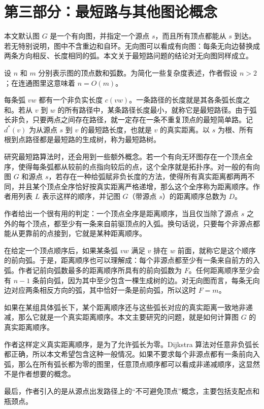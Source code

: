 \documentclass[UTF8]{ctexart}
\begin{document}
\section*{第三部分：最短路与其他图论概念}
本文默认图 $G$ 是一个有向图，并指定一个源点 $s$，而且所有顶点都能从 $s$ 到达。若无特别说明，图中不含重边和自环。无向图可以看成有向图：每条无向边替换成两条方向相反、长度相同的弧。本文关于最短路问题的结论对无向图同样成立。

设 $n$ 和 $m$ 分别表示图的顶点数和弧数。为简化一些复杂度表述，作者假设 $n>2$；在连通图里这意味着 $n=O(m)$。

每条弧 $vw$ 都有一个非负实长度 $c(vw)$。一条路径的长度就是其各条弧长度之和。若从 $v$ 到 $w$ 的所有路径中，某条路径长度最小，就称它是最短路径。由于弧长非负，只要两点之间存在路径，就一定存在一条不重复顶点的最短简单路。记 $d^*(v)$ 为从源点 $s$ 到 $v$ 的最短路长度，也就是 $v$ 的真实距离。以 $s$ 为根、所有根到点路径都是最短路的生成树，称为最短路树。

研究最短路算法时，还会用到一些额外概念。若一个有向无环图存在一个顶点全序，使得每条弧都从较前的点指向较后的点，这个全序就是拓扑序。对一般的有向图 $G$ 和源点 $s$，若存在一种给弧赋非负长度的方法，使得所有真实距离都两两不同，并且某个顶点全序恰好按真实距离严格递增，那么这个全序称为距离顺序。作者用列表 $L$ 表示这样的顺序，并记图 $G$（带源点 $s$）的距离顺序总数为 $D$。

作者给出一个很有用的判定：一个顶点全序是距离顺序，当且仅当除了源点 $s$ 之外的每个顶点，都至少有一条来自前驱顶点的入弧。换句话说，只要每个非源点都能从更靠前的点接到，它就是某种距离顺序。

在给定一个顶点顺序后，如果某条弧 $vw$ 满足 $v$ 排在 $w$ 前面，就称它是这个顺序的前向弧。于是，距离顺序也可以理解成：每个非源点都至少有一条来自前方的入弧。作者记前向弧数最多的距离顺序所具有的前向弧数为 $F$。任何距离顺序至少会有 $n-1$ 条前向弧，因为其中至少包含一棵生成树的边。对无向图而言，每条无向边对应两条相反方向的弧，其中恰好一条是前向弧，所以这时 $F=m$。

如果在某组具体弧长下，某个距离顺序还与这些弧长对应的真实距离一致地非递减，那么它就是一个真实距离顺序。本文主要研究的问题，就是如何计算图 $G$ 的真实距离顺序。

作者这样定义真实距离顺序，是为了允许弧长为零。Dijkstra 算法对任意非负弧长都正确，所以本文希望包含这种一般情况。如果不要求每个非源点都有一条前向入弧，那么在所有弧长都为零的图里，任意顶点顺序都可以看成非递减顺序，这显然不是作者想要的概念。

最后，作者引入的是从源点出发路径上的“不可避免顶点”概念，主要包括支配点和瓶颈点。
\end{document}
